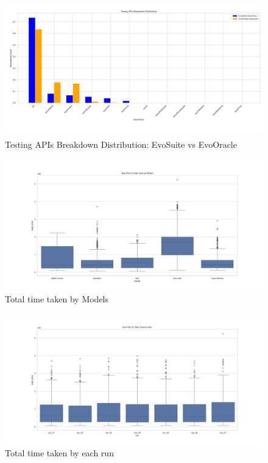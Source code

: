 \begin{figure}[H]
\centering
\includegraphics[width=1\textwidth]{images/test_api_distribution.png}
\caption{Testing APIs Breakdown Distribution: EvoSuite vs EvoOracle}
\label{fig:test_api_distribution}
\end{figure}

\begin{figure}[H]
\centering
\includegraphics[width=1\textwidth]{images/time_by_model.png}
\caption{Total time taken by Models}
\label{fig:time_models}
\end{figure}

\begin{figure}[H]
\centering
\includegraphics[width=1\textwidth]{images/time_by_runs.png}
\caption{Total time taken by each run}
\label{fig:time_runs}
\end{figure}

